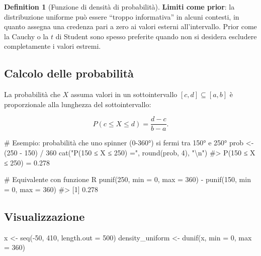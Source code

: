 \documentclass[
  letterpaper,
  DIV=11,
  numbers=noendperiod,
  oneside]{scrreprt}
\newenvironment{Shaded}{\begin{snugshade}}{\end{snugshade}}
\newcommand{\AttributeTok}[1]{\textcolor[rgb]{0.40,0.45,0.13}{#1}}
\newcommand{\CommentTok}[1]{\textcolor[rgb]{0.37,0.37,0.37}{#1}}
\newcommand{\DecValTok}[1]{\textcolor[rgb]{0.68,0.00,0.00}{#1}}
\newcommand{\FunctionTok}[1]{\textcolor[rgb]{0.28,0.35,0.67}{#1}}
\newcommand{\NormalTok}[1]{\textcolor[rgb]{0.00,0.23,0.31}{#1}}
\newcommand{\OtherTok}[1]{\textcolor[rgb]{0.00,0.23,0.31}{#1}}
\newcommand{\SpecialCharTok}[1]{\textcolor[rgb]{0.37,0.37,0.37}{#1}}
\newcommand{\StringTok}[1]{\textcolor[rgb]{0.13,0.47,0.30}{#1}}
\theoremstyle{definition}
\theoremstyle{plain}
\theoremstyle{definition}
\newtheorem{definition}{Definition}[chapter]
\theoremstyle{remark}
\begin{document}
\begin{definition}[Funzione di densità di
probabilità]
\textbf{Limiti come prior}: la distribuzione uniforme può essere
``troppo informativa'' in alcuni contesti, in quanto assegna una
credenza pari a zero ai valori esterni all'intervallo. Prior come la
Cauchy o la \(t\) di Student sono spesso preferite quando non si
desidera escludere completamente i valori estremi.

\subsection{Calcolo delle
probabilità}\label{calcolo-delle-probabilituxe0}

La probabilità che \(X\) assuma valori in un sottointervallo
\([c, d] \subseteq [a, b]\) è proporzionale alla lunghezza del
sottointervallo:

\[
P(c \leq X \leq d) = \frac{d - c}{b - a}.
\]

\begin{Shaded}
\begin{Highlighting}[]
\CommentTok{\# Esempio: probabilità che uno spinner (0{-}360°) si fermi tra 150° e 250°}
\NormalTok{prob }\OtherTok{\textless{}{-}}\NormalTok{ (}\DecValTok{250} \SpecialCharTok{{-}} \DecValTok{150}\NormalTok{) }\SpecialCharTok{/} \DecValTok{360}
\FunctionTok{cat}\NormalTok{(}\StringTok{"P(150 ≤ X ≤ 250) ="}\NormalTok{, }\FunctionTok{round}\NormalTok{(prob, }\DecValTok{4}\NormalTok{), }\StringTok{"}\SpecialCharTok{\textbackslash{}n}\StringTok{"}\NormalTok{)}
\CommentTok{\#\textgreater{} P(150 ≤ X ≤ 250) = 0.278}

\CommentTok{\# Equivalente con funzione R}
\FunctionTok{punif}\NormalTok{(}\DecValTok{250}\NormalTok{, }\AttributeTok{min =} \DecValTok{0}\NormalTok{, }\AttributeTok{max =} \DecValTok{360}\NormalTok{) }\SpecialCharTok{{-}} \FunctionTok{punif}\NormalTok{(}\DecValTok{150}\NormalTok{, }\AttributeTok{min =} \DecValTok{0}\NormalTok{, }\AttributeTok{max =} \DecValTok{360}\NormalTok{)}
\CommentTok{\#\textgreater{} [1] 0.278}
\end{Highlighting}
\end{Shaded}

\subsection{Visualizzazione}\label{visualizzazione}

\begin{Shaded}
\begin{Highlighting}[]
\NormalTok{x }\OtherTok{\textless{}{-}} \FunctionTok{seq}\NormalTok{(}\SpecialCharTok{{-}}\DecValTok{50}\NormalTok{, }\DecValTok{410}\NormalTok{, }\AttributeTok{length.out =} \DecValTok{500}\NormalTok{)}
\NormalTok{density\_uniform }\OtherTok{\textless{}{-}} \FunctionTok{dunif}\NormalTok{(x, }\AttributeTok{min =} \DecValTok{0}\NormalTok{, }\AttributeTok{max =} \DecValTok{360}\NormalTok{)}


\end{Highlighting}
\end{Shaded}
\end{definition}
\end{document}
